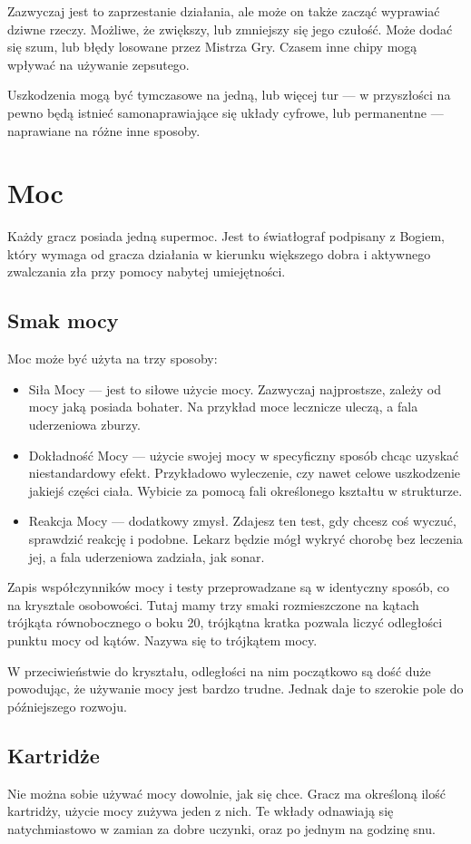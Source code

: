 Zazwyczaj jest to zaprzestanie działania, ale może on także zacząć wyprawiać dziwne rzeczy.
Możliwe, że zwiększy, lub zmniejszy się jego czułość.
Może dodać się szum, lub błędy losowane przez Mistrza Gry.
Czasem inne chipy mogą wpływać na używanie zepsutego.

Uszkodzenia mogą być tymczasowe na jedną, lub więcej tur --- w przyszłości na pewno będą istnieć samonaprawiające się układy cyfrowe, lub permanentne --- naprawiane na różne inne sposoby.

\section{Moc}
Każdy gracz posiada jedną supermoc.
Jest to światłograf podpisany z Bogiem, który wymaga od gracza działania w kierunku większego dobra i aktywnego zwalczania zła przy pomocy nabytej umiejętności.

\subsection{Smak mocy}
Moc może być użyta na trzy sposoby:
\begin{itemize}
 \item Siła Mocy \absm --- jest to siłowe użycie mocy. Zazwyczaj najprostsze, zależy od mocy jaką posiada bohater. Na przykład moce lecznicze uleczą, a fala uderzeniowa zburzy.
 \item Dokładność Mocy \abdm --- użycie swojej mocy w specyficzny sposób chcąc uzyskać niestandardowy efekt. Przykładowo wyleczenie, czy nawet celowe uszkodzenie jakiejś części ciała. Wybicie za pomocą fali określonego kształtu w strukturze.
 \item Reakcja Mocy \abrm --- dodatkowy zmysł. Zdajesz ten test, gdy chcesz coś wyczuć, sprawdzić reakcję i podobne. Lekarz będzie mógł wykryć chorobę bez leczenia jej, a fala uderzeniowa zadziała, jak sonar.
\end{itemize}

Zapis współczynników mocy i testy przeprowadzane są w identyczny sposób, co na krysztale osobowości.
Tutaj mamy trzy smaki rozmieszczone na kątach trójkąta równobocznego o boku 20, trójkątna kratka pozwala liczyć odległości punktu mocy od kątów.
Nazywa się to trójkątem mocy.

W przeciwieństwie do kryształu, odległości na nim początkowo są dość duże powodując, że używanie mocy jest bardzo trudne.
Jednak daje to szerokie pole do późniejszego rozwoju.

\subsection{Kartridże}
Nie można sobie używać mocy dowolnie, jak się chce.
Gracz ma określoną ilość kartridży, użycie mocy zużywa jeden z nich.
Te wkłady odnawiają się natychmiastowo w zamian za dobre uczynki, oraz po jednym na godzinę snu.

